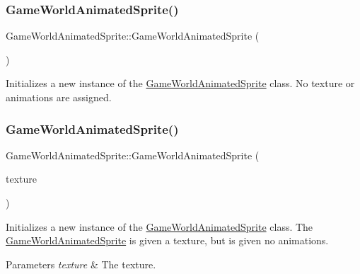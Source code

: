 \subsubsection{\texorpdfstring{Game\+World\+Animated\+Sprite()}{GameWorldAnimatedSprite()}\hspace{0.1cm}{\footnotesize\ttfamily [1/3]}}
{\footnotesize\ttfamily Game\+World\+Animated\+Sprite\+::\+Game\+World\+Animated\+Sprite (\begin{DoxyParamCaption}{ }\end{DoxyParamCaption})}



Initializes a new instance of the \hyperlink{class_game_world_animated_sprite}{Game\+World\+Animated\+Sprite} class. No texture or animations are assigned. 

\mbox{\label{class_game_world_animated_sprite_a6b80254cbd23ab70708c9a48fbc33ce7}} 
\subsubsection{\texorpdfstring{Game\+World\+Animated\+Sprite()}{GameWorldAnimatedSprite()}\hspace{0.1cm}{\footnotesize\ttfamily [2/3]}}
{\footnotesize\ttfamily Game\+World\+Animated\+Sprite\+::\+Game\+World\+Animated\+Sprite (\begin{DoxyParamCaption}\item[{const sf\+::\+Texture \&}]{texture }\end{DoxyParamCaption})\hspace{0.3cm}{\ttfamily [explicit]}}



Initializes a new instance of the \hyperlink{class_game_world_animated_sprite}{Game\+World\+Animated\+Sprite} class. The \hyperlink{class_game_world_animated_sprite}{Game\+World\+Animated\+Sprite} is given a texture, but is given no animations. 


\begin{DoxyParams}{Parameters}
{\em texture} & The texture.\\
\hline
\end{DoxyParams}
\mbox{\label{class_game_world_animated_sprite_af8277765bcbb4eb8b5621c6141324b94}} 
